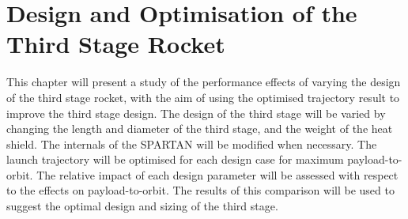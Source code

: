 
\chapter{Design and Optimisation of the Third Stage Rocket}

This chapter will present a study of the performance effects of varying the design of the third stage rocket, with the aim of using the optimised trajectory result to improve the third stage design. 
The design of the third stage will be varied by changing the length and diameter of the third stage, and the weight of the heat shield. The internals of the SPARTAN will be modified when necessary. The launch trajectory will be optimised for each design case for maximum payload-to-orbit. The relative impact of each design parameter will be assessed with respect to the effects on payload-to-orbit. The results of this comparison will be used to suggest the optimal design and sizing of the third stage.  


